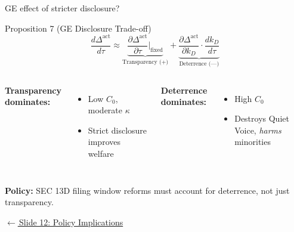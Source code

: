 \documentclass[aspectratio=169,10pt]{beamer}
\newcommand{\1}{\mathbf{1}}
\newcommand{\returnlink}[2]{%
  \par\vspace{0.2em}\hfill{\scriptsize\hyperlink{#1}{\textcolor{brightblue}{$\leftarrow$\,#2}}}%
}
\begin{document}
\begin{frame}{GE effect of stricter disclosure?}
\hypertarget{backup:GE_disclosure}{}
\small
\begin{block}{Proposition 7 (GE Disclosure Trade-off)}
\vspace{-0.3em}
\[
\frac{d\Delta^{\text{act}}}{d\tau} \approx \underbrace{\frac{\partial\Delta^{\text{act}}}{\partial\tau}\bigg|_{\text{fixed}}}_{\text{Transparency (+)}} + \underbrace{\frac{\partial\Delta^{\text{act}}}{\partial k_D}\cdot\frac{dk_D}{d\tau}}_{\text{Deterrence (---)}}
\]
\vspace{-0.5em}
\end{block}

\begin{columns}[T,onlytextwidth]
{\small\textbf{Transparency dominates:}}
\begin{itemize}\itemsep0pt
  \item Low $C_0$, moderate $\kappa$
  \item Strict disclosure improves welfare
\end{itemize}

{\small\textbf{Deterrence dominates:}}
\begin{itemize}\itemsep0pt
  \item High $C_0$
  \item Destroys Quiet Voice, \emph{harms} minorities
\end{itemize}
\end{columns}

\vspace{0.2em}
{\small\textbf{Policy:} SEC 13D filing window reforms must account for deterrence, not just transparency.}

\returnlink{main:policy}{Slide 12: Policy Implications}
\end{frame}
\end{document}
